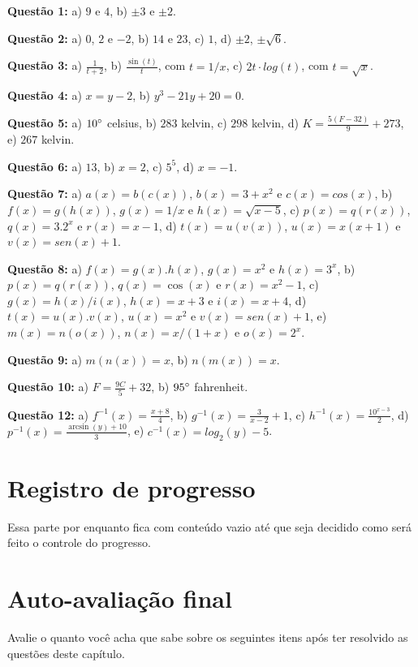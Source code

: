 \documentclass[main_estudante.tex]{subfiles}
\begin{document}
\noindent\textbf{Questão 1:} a) $9$ e $4$, b) $\pm3$ e $\pm2$.

\noindent\textbf{Questão 2:} a) $0$, $2$ e $-2$, b) $14$ e $23$, c) $1$, d) $\pm2$, $\pm\sqrt{6}$.

\noindent\textbf{Questão 3:} a) $\frac{1}{t+2}$, b) $\frac{\sin(t)}{t}$, com $t=1/x$, c) $2t \cdot log(t)$, com $t=\sqrt{x}$.

\noindent\textbf{Questão 4:} a) $x=y-2$, b) $y^3-21y+20=0$.

\noindent\textbf{Questão 5:} a) $10\degree$ celsius, b) $283$ kelvin, c) $298$ kelvin, d) $K=\frac{5(F-32)}{9}+273$, e) $267$ kelvin.

\noindent\textbf{Questão 6:} a) $13$, b) $x=2$, c) $5^5$, d) $x=-1$.

\noindent\textbf{Questão 7:} a) $a(x)=b(c(x))$, $b(x)=3+x^2$ e $c(x)=cos(x)$, b) $f(x)=g(h(x))$, $g(x)=1/x$ e $h(x)=\sqrt{x-5}$, c) $p(x)=q(r(x))$, $q(x)=3.2^x$ e $r(x)=x-1$, d) $t(x)=u(v(x))$, $u(x)=x(x+1)$ e $v(x)=sen(x)+1$.

\noindent\textbf{Questão 8:} a) $f(x)=g(x).h(x)$, $g(x)=x^2$ e $h(x)=3^x$, b) $p(x)=q(r(x))$, $q(x)=\cos(x)$ e $r(x)=x^2-1$, c) $g(x)=h(x)/i(x)$, $h(x)=x+3$ e $i(x)=x+4$, d) $t(x)=u(x).v(x)$, $u(x)=x^2$ e $v(x)=sen(x)+1$, e) $m(x)=n(o(x))$, $n(x)=x/(1+x)$ e $o(x)=2^x$.

\noindent\textbf{Questão 9:} a) $m(n(x))=x$, b) $n(m(x))=x$.

\noindent\textbf{Questão 10:} a) $F=\frac{9C}{5}+32$, b) $95\degree$ fahrenheit.

\noindent\textbf{Questão 12:} a) $f^{-1}(x)=\frac{x+8}{4}$, b) $g^{-1}(x)=\frac{3}{x-2}+1$, c) $h^{-1}(x)=\frac{10^{x-3}}{2}$, d) $p^{-1}(x)=\frac{\arcsin(y)+10}{3}$, e) $c^{-1}(x)=log_2 (y)-5$.

\section{Registro de progresso}

Essa parte por enquanto fica com conteúdo vazio até que seja decidido como será feito o controle do progresso.

\newpage

\section{Auto-avaliação final}
Avalie o quanto você acha que sabe sobre os seguintes itens após ter resolvido as questões deste capítulo.
\end{document}
